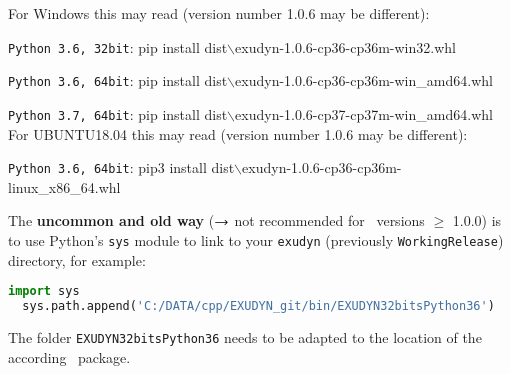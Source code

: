 For Windows this may read (version number 1.0.6 may be different):
\bi
  \item \texttt{Python 3.6, 32bit}: pip install dist$\backslash$exudyn-1.0.6-cp36-cp36m-win32.whl
  \item \texttt{Python 3.6, 64bit}: pip install dist$\backslash$exudyn-1.0.6-cp36-cp36m-win\_amd64.whl
  \item \texttt{Python 3.7, 64bit}: pip install dist$\backslash$exudyn-1.0.6-cp37-cp37m-win\_amd64.whl
\ei
For UBUNTU18.04 this may read (version number 1.0.6 may be different):
\bi
  \item \texttt{Python 3.6, 64bit}: pip3 install dist$\backslash$exudyn-1.0.6-cp36-cp36m-linux\_x86\_64.whl
\ei

The {\bf uncommon and old way} ($\rightarrow$ not recommended for \codeName\ versions $\ge$ 1.0.0) is to use Python's \texttt{sys} module to link to your \texttt{exudyn} (previously \texttt{WorkingRelease}) directory, for example:\vspace{6pt}\\
\pythonstyle
\begin{lstlisting}[language=Python, firstnumber=1]
  import sys
  sys.path.append('C:/DATA/cpp/EXUDYN_git/bin/EXUDYN32bitsPython36')
\end{lstlisting}
%
The folder \texttt{EXUDYN32bitsPython36} needs to be adapted to the location of the according \codeName\ package.




